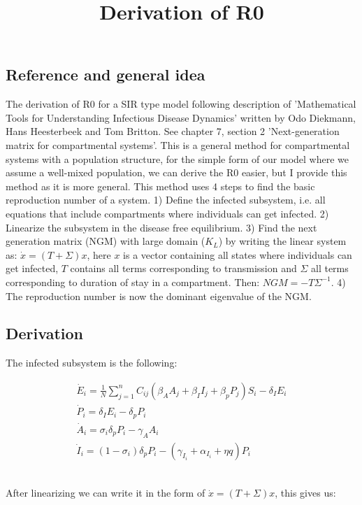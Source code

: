 \documentclass{article}
\title{Derivation of R0}
\begin{document}
\maketitle

\subsection*{Reference and general idea}

The derivation of R0 for a SIR type model following description of 'Mathematical Tools for Understanding Infectious Disease Dynamics' written by Odo Diekmann, Hans Heesterbeek and Tom Britton. 
See chapter 7, section 2 'Next-generation matrix for compartmental systems'. 
This is a general method for compartmental systems with a population structure, for the simple form of our model where we assume a well-mixed population, we can derive the R0 easier, but I provide this method as it is more general. 
This method uses 4 steps to find the basic reproduction number of a system.
1) Define the infected subsystem, i.e. all equations that include compartments where individuals can get infected. 
2) Linearize the subsystem in the disease free equilibrium. 
3) Find the next generation matrix (NGM) with large domain ($K_L$) by writing the linear system as: $\dot{x} = (T + \Sigma) x$, here $x$ is a vector containing all states where individuals can get infected, $T$ contains all terms corresponding to transmission and $\Sigma$ all terms corresponding to duration of stay in a compartment. Then: $NGM = -T \Sigma^{-1}. $
4) The reproduction number is now the dominant eigenvalue of the NGM. 

\subsection*{Derivation}

The infected subsystem is the following: 

\begin{gather*}
    \dot{E}_i = \frac{1}{N} \sum_{j = 1}^n C_{ij}(\beta_A A_j + \beta_I I_j + \beta_p P_j) S_i - \delta_I E_i \\
    \dot{P}_i = \delta_I E_i - \delta_p P_i \\
    \dot{A}_i = \sigma_i \delta_p P_i - \gamma_A A_i \\
    \dot{I}_i = (1-\sigma_i) \delta_p P_i - (\gamma_{I_i} + \alpha_{I_i} + \eta q) P_i   
\end{gather*}

\\
\noindent
After linearizing we can write it in the form of $\dot{x} = (T + \Sigma) x$, this gives us:
\end{document}
